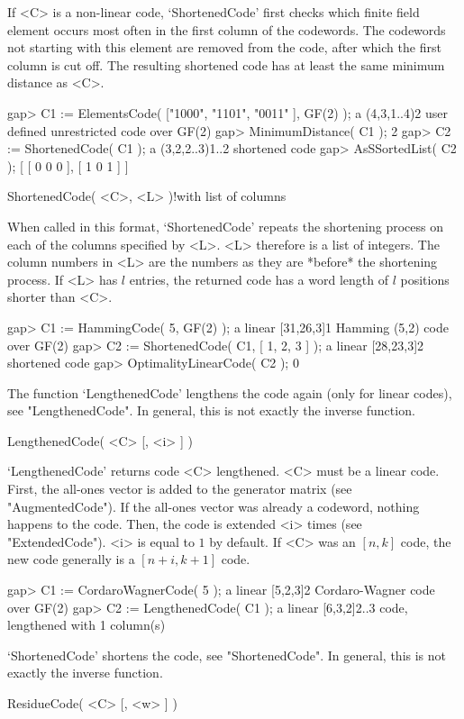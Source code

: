 If  <C> is a non-linear  code,  `ShortenedCode' first checks which finite
field element occurs most often in the first column of the codewords. The
codewords not starting with this element are removed from the code, after
which the first  column is cut off. The  resulting shortened code  has at
least the same minimum distance as <C>.

\beginexample
gap> C1 := ElementsCode( ["1000", "1101", "0011" ], GF(2) );
a (4,3,1..4)2 user defined unrestricted code over GF(2)
gap> MinimumDistance( C1 );
2
gap> C2 := ShortenedCode( C1 );
a (3,2,2..3)1..2 shortened code
gap> AsSSortedList( C2 );
[ [ 0 0 0 ], [ 1 0 1 ] ] 
\endexample

\>ShortenedCode( <C>, <L> )!{with list of columns}

When called  in    this format, `ShortenedCode'  repeats  the  shortening
process on each of the columns specified by  <L>. <L> therefore is a list
of integers. The   column numbers in  <L>  are  the numbers as   they are
*before* the shortening  process. If  <L> has  $l$ entries, the  returned
code has a word length of $l$ positions shorter than <C>.

\beginexample
gap> C1 := HammingCode( 5, GF(2) );
a linear [31,26,3]1 Hamming (5,2) code over GF(2)
gap> C2 := ShortenedCode( C1, [ 1, 2, 3 ] );
a linear [28,23,3]2 shortened code
gap> OptimalityLinearCode( C2 );
0 
\endexample

The function `LengthenedCode'  lengthens the code  again (only for linear
codes), see "LengthenedCode". In general, this is not exactly the inverse
function.

\>LengthenedCode( <C> [, <i> ] )

`LengthenedCode' returns  code  <C>  lengthened.  <C>  must  be a   linear
code. First,  the all-ones vector is added  to the  generator matrix (see
"AugmentedCode"). If the all-ones vector  was already a codeword, nothing
happens   to the  code.  Then,   the code is     extended <i> times  (see
"ExtendedCode"). <i> is  equal to $1$ by  default. If <C> was  an $[n,k]$
code, the new code generally is a $[n+i,k+1]$ code.

\beginexample
gap> C1 := CordaroWagnerCode( 5 );
a linear [5,2,3]2 Cordaro-Wagner code over GF(2)
gap> C2 := LengthenedCode( C1 );
a linear [6,3,2]2..3 code, lengthened with 1 column(s) 
\endexample

`ShortenedCode' shortens the code,  see "ShortenedCode". In general, this
is not exactly the inverse function.

\>ResidueCode( <C> [, <w> ] )

